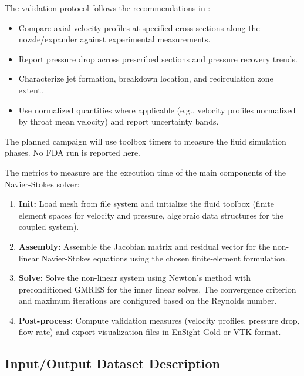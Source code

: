 The validation protocol follows the recommendations in \cite{hariharan_multilaboratory_2011,stewart_assessment_2012}:
\begin{itemize}
    \item Compare axial velocity profiles at specified cross-sections along the nozzle/expander against experimental measurements.
    \item Report pressure drop across prescribed sections and pressure recovery trends.
    \item Characterize jet formation, breakdown location, and recirculation zone extent.
    \item Use normalized quantities where applicable (e.g., velocity profiles normalized by throat mean velocity) and report uncertainty bands.
\end{itemize}

The planned campaign will use toolbox timers to measure the fluid simulation phases. No FDA run is reported here.

The metrics to measure are the execution time of the main components of the Navier-Stokes solver:
\begin{enumerate}
\item \textbf{Init:} Load mesh from file system and initialize the fluid toolbox (finite element spaces for velocity and pressure, algebraic data structures for the coupled system).
\item \textbf{Assembly:} Assemble the Jacobian matrix and residual vector for the non-linear Navier-Stokes equations using the chosen finite-element formulation.
\item \textbf{Solve:} Solve the non-linear system using Newton's method with preconditioned GMRES for the inner linear solves. The convergence criterion and maximum iterations are configured based on the Reynolds number.
\item \textbf{Post-process:} Compute validation measures (velocity profiles, pressure drop, flow rate) and export visualization files in EnSight Gold or VTK format.
\end{enumerate}





\subsection{Input/Output Dataset Description}


